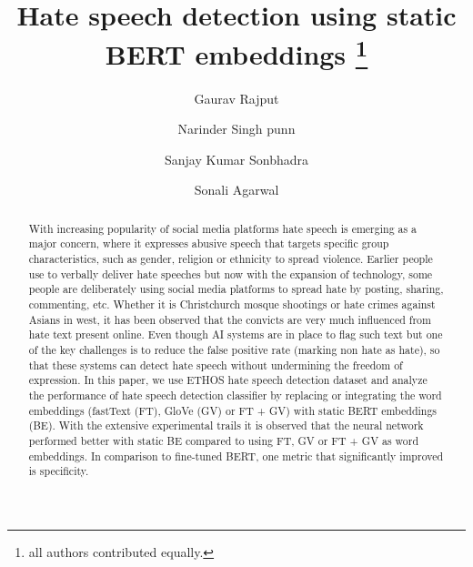 \documentclass[runningheads]{llncs}
\begin{document}
\title{Hate speech detection using static BERT embeddings \thanks{all authors contributed equally.}}
\author{Gaurav Rajput\and
Narinder Singh punn\and
Sanjay Kumar Sonbhadra \and
Sonali Agarwal
}
\maketitle              \begin{abstract}
With increasing popularity of social media platforms hate speech is emerging as a major concern, where it expresses abusive speech that targets specific group characteristics, such as gender, religion or ethnicity to spread violence. Earlier people use to verbally deliver hate speeches but now with the expansion of technology, some people are deliberately using social media platforms to spread hate by posting, sharing, commenting, etc. Whether it is Christchurch mosque shootings or hate crimes against Asians in west, it has been observed that the convicts are very much influenced from hate text present online. Even though AI systems are in place to flag such text but one of the key challenges is to reduce the false positive rate (marking non hate as hate), so that these systems can detect hate speech without undermining the freedom of expression. In this paper, we use ETHOS hate speech detection dataset and analyze the performance of hate speech detection classifier by replacing or integrating the word embeddings (fastText (FT), GloVe (GV) or FT + GV) with static BERT embeddings (BE). With the extensive experimental trails it is observed that the neural network performed better with static BE compared to using FT, GV or FT + GV as word embeddings. In comparison to fine-tuned BERT, one metric that significantly improved is specificity.

\end{abstract}
\end{document}
